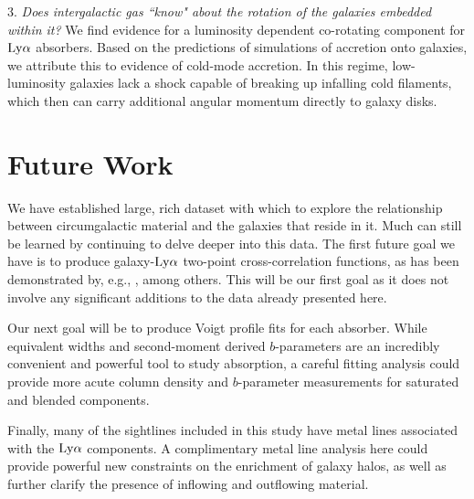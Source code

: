 \vspace{10pt}

3. \emph{Does intergalactic gas ``know" about the rotation of the galaxies embedded within it?}
We find evidence for a luminosity dependent co-rotating component for $\rm Ly\alpha$ absorbers. Based on the predictions of simulations of accretion onto galaxies, we attribute this to evidence of cold-mode accretion. In this regime, low-luminosity galaxies lack a shock capable of breaking up infalling cold filaments, which then can carry additional angular momentum directly to galaxy disks.


\section{Future Work}

We have established large, rich dataset with which to explore the relationship between circumgalactic material and the galaxies that reside in it. Much can still be learned by continuing to delve deeper into this data. The first future goal we have is to produce galaxy-$\rm Ly\alpha$ two-point cross-correlation functions, as has been demonstrated by, e.g., \cite{chen2005}, among others. This will be our first goal as it does not involve any significant additions to the data already presented here.

Our next goal will be to produce Voigt profile fits for each absorber. While equivalent widths and second-moment derived $b$-parameters are an incredibly convenient and powerful tool to study absorption, a careful fitting analysis could provide more acute column density and $b$-parameter measurements for saturated and blended components.

Finally, many of the sightlines included in this study have metal lines associated with the $\rm Ly\alpha$ components. A complimentary metal line analysis here could provide powerful new constraints on the enrichment of galaxy halos, as well as further clarify the presence of inflowing and outflowing material. 

\clearpage
{} %


%


